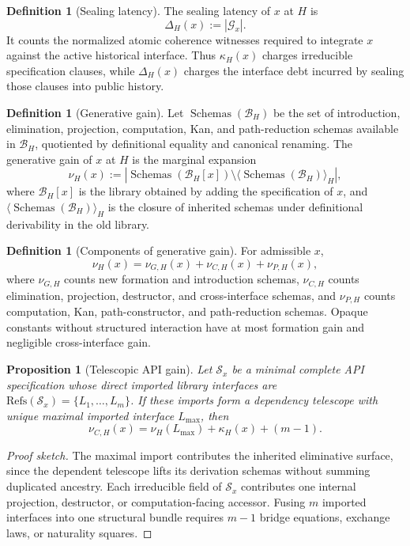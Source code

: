 \documentclass[11pt]{article}
\theoremstyle{plain}
\newtheorem{proposition}[theorem]{Proposition}
\theoremstyle{definition}
\newtheorem{definition}[theorem]{Definition}
\theoremstyle{remark}
\newenvironment{proofsketch}{\begin{proof}[Proof sketch]}{\end{proof}}
\newcommand{\B}{\mathcal{B}}
\newcommand{\Schemas}{\operatorname{Schemas}}
\begin{document}
\begin{definition}[Sealing latency]
The sealing latency of \(x\) at \(H\) is
\[
\Delta_H(x):=|\mathcal{G}_x|.
\]
It counts the normalized atomic coherence witnesses required to integrate \(x\) against the active historical interface. Thus \(\kappa_H(x)\) charges irreducible specification clauses, while \(\Delta_H(x)\) charges the interface debt incurred by sealing those clauses into public history.
\end{definition}

\begin{definition}[Generative gain]
Let \(\Schemas(\B_H)\) be the set of introduction, elimination, projection, computation, Kan, and path-reduction schemas available in \(\B_H\), quotiented by definitional equality and canonical renaming. The generative gain of \(x\) at \(H\) is the marginal expansion
\[
\nu_H(x):=
\left|
\Schemas(\B_H[x])\setminus
\langle \Schemas(\B_H)\rangle_H
\right|,
\]
where \(\B_H[x]\) is the library obtained by adding the specification of \(x\), and \(\langle \Schemas(\B_H)\rangle_H\) is the closure of inherited schemas under definitional derivability in the old library.
\end{definition}

\begin{definition}[Components of generative gain]
For admissible \(x\),
\[
\nu_H(x)=\nu_{G,H}(x)+\nu_{C,H}(x)+\nu_{P,H}(x),
\]
where \(\nu_{G,H}\) counts new formation and introduction schemas, \(\nu_{C,H}\) counts elimination, projection, destructor, and cross-interface schemas, and \(\nu_{P,H}\) counts computation, Kan, path-constructor, and path-reduction schemas. Opaque constants without structured interaction have at most formation gain and negligible cross-interface gain.
\end{definition}

\begin{proposition}[Telescopic API gain]
Let \(\mathcal{S}_x\) be a minimal complete API specification whose direct imported library interfaces are \(\mathrm{Refs}(\mathcal{S}_x)=\{L_1,\ldots,L_m\}\). If these imports form a dependency telescope with unique maximal imported interface \(L_{\max}\), then
\[
\nu_{C,H}(x)=\nu_H(L_{\max})+\kappa_H(x)+(m-1).
\]
\end{proposition}

\begin{proofsketch}
The maximal import contributes the inherited eliminative surface, since the dependent telescope lifts its derivation schemas without summing duplicated ancestry. Each irreducible field of \(\mathcal{S}_x\) contributes one internal projection, destructor, or computation-facing accessor. Fusing \(m\) imported interfaces into one structural bundle requires \(m-1\) bridge equations, exchange laws, or naturality squares.
\end{proofsketch}
\end{document}
